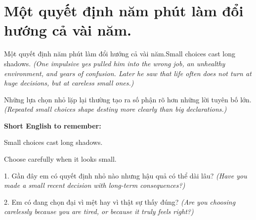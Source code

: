 \section{Một quyết định năm phút làm đổi hướng cả vài năm.}
\begin{truyen}{Một quyết định năm phút làm đổi hướng cả vài năm.}{Small choices cast long shadows.}
\textit{(One impulsive yes pulled him into the wrong job, an unhealthy environment, and years of confusion. Later he saw that life often does not turn at huge decisions, but at careless small ones.)}
\end{truyen}
\begin{baihoc}
Những lựa chọn nhỏ lặp lại thường tạo ra số phận rõ hơn những lời tuyên bố lớn.
\textit{(Repeated small choices shape destiny more clearly than big declarations.)}
\end{baihoc}
\begin{ghinhoanh}
\textbf{Short English to remember:}

Small choices cast long shadows.

Choose carefully when it looks small.
\end{ghinhoanh}
\begin{tuhocnhanh}
1. Gần đây em có quyết định nhỏ nào nhưng hậu quả có thể dài lâu? \textit{(Have you made a small recent decision with long-term consequences?)}

2. Em có đang chọn đại vì mệt hay vì thật sự thấy đúng? \textit{(Are you choosing carelessly because you are tired, or because it truly feels right?)}
\end{tuhocnhanh}
\ngancach

